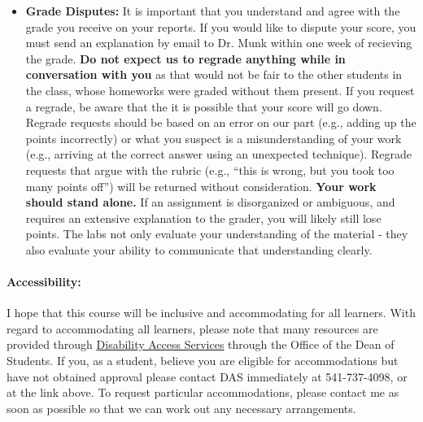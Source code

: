 \documentclass[11pt, a4paper]{article}
\begin{document}
\begin{itemize}
\item[] \textbf{Grade Disputes:} It is important that you understand and agree
        with the grade you receive on your reports. If you would like
        to dispute your score, you must send an explanation by email to Dr.
        Munk within one week of recieving the grade.
        \textbf{Do not expect us to regrade anything while in conversation with
        you} as that would not be fair to the other students in the class, whose
        homeworks were graded without them present.  If you request a regrade,
        be aware that the it is possible that your score will go down.
        Regrade requests should be based on an error on our part (e.g., adding
        up the points incorrectly) or what you suspect is a misunderstanding of
        your work (e.g., arriving at the correct answer using an unexpected
        technique). Regrade requests that argue with the rubric (e.g., ``this is
        wrong, but you took too many points off'') will be returned without
        consideration.
        \textbf{Your work should stand alone.} If an assignment is disorganized or
        ambiguous, and requires an extensive explanation to the grader, you
        will likely still lose points. The labs not only evaluate your
        understanding of the material - they also evaluate your ability to
        communicate that understanding clearly.
\end{itemize}

\paragraph{Accessibility:} I hope that this course will be inclusive and
accommodating for all learners. 
With regard to accommodating all learners, please note that many
resources are provided through
\href{http://ds.oregonstate.edu}{Disability Access Services} through the Office of the Dean of Students. 
If you, as a student, believe you are eligible for accommodations but have not obtained approval please contact DAS immediately at 541-737-4098, or at the link above. 
To request
particular accommodations, please contact me as soon as possible so that we can
work out any necessary arrangements.
\end{document}
